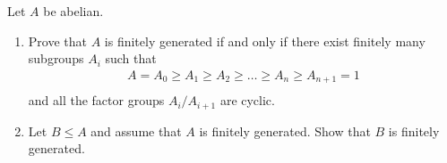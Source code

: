 \documentclass{article}
\begin{document}
\begin{homeworkProblem}
    


    
    
    
    



    
\end{homeworkProblem}

\pagebreak

\begin{homeworkProblem}
    Let $A$ be abelian.
    \begin{enumerate}
        \item Prove that $A$ is finitely generated if and only if 
        there exist finitely many subgroups $A_i$ such that 
        \begin{align}
            A = A_0 \geq A_1 \geq A_2 \geq \ldots \geq A_n \geq A_{n+1} = 1\\
        \end{align}
        and all the factor groups $A_i / A_{i+1}$ are cyclic.
    \item Let $B \leq A$ and assume that $A$ is finitely generated.
        Show that $B$ is finitely generated.
    \end{enumerate}
    \solution


    


\end{homeworkProblem}

\pagebreak

\begin{homeworkProblem}

    
\end{homeworkProblem}
\end{document}
